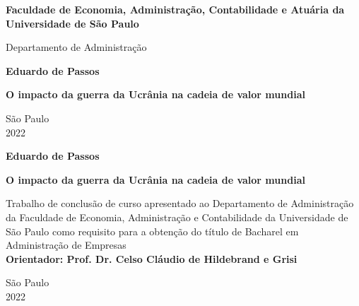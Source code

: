 \documentclass[12pt]{article}
\begin{document}
\begin{titlepage}
    \begin{center}
        \Large
        \textbf{Faculdade de Economia, Administração, Contabilidade e Atuária da Universidade de São Paulo}
        
        \large
        \vspace{0.4cm}
        Departamento de Administração
             
        \vspace{4cm}
        \textbf{Eduardo de Passos}

        \vspace{4cm}
        \textbf{O impacto da guerra da Ucrânia na cadeia de valor mundial}

        \vspace{8cm}
        São Paulo\\
        2022\\
             
    \end{center}
\end{titlepage}
\begin{titlepage}
    \begin{center}
        \vspace{4cm}
        \large\textbf{Eduardo de Passos}
             
        
        \vspace{4cm}
        \large\textbf{O impacto da guerra da Ucrânia na cadeia de valor mundial}
    \end{center}

        \vspace{4cm}
        \hspace{7cm}
        \begin{minipage}{22em}
            Trabalho de conclusão de curso
            apresentado ao Departamento de
            Administração da Faculdade de Economia,
            Administração e Contabilidade da
            Universidade de São Paulo como requisito  para a
            obtenção do título de Bacharel 
            em Administração de Empresas\\
            \textbf{Orientador: Prof. Dr. Celso Cláudio de Hildebrand e Grisi}
        \end{minipage}
              
        \hspace{7cm}
    
    \vspace{8cm}
    \begin{center}
        São Paulo\\
        2022\\
    \end{center}
\end{titlepage}
\end{document}
